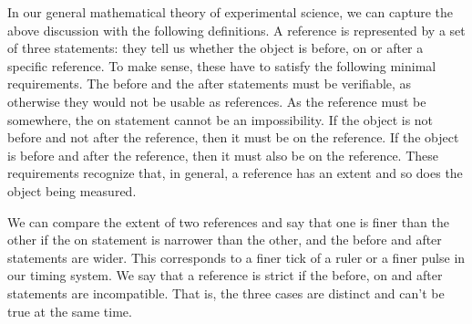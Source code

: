 \documentclass[11pt,letterpaper,fleqn]{memoir} %
\begin{document}
In our general mathematical theory of experimental science, we can capture the above discussion with the following definitions. A reference is represented by a set of three statements: they tell us whether the object is before, on or after a specific reference. To make sense, these have to satisfy the following minimal requirements. The before and the after statements must be verifiable, as otherwise they would not be usable as references. As the reference must be somewhere, the on statement cannot be an impossibility. If the object is not before and not after the reference, then it must be on the reference. If the object is before and after the reference, then it must also be on the reference. These requirements recognize that, in general, a reference has an extent and so does the object being measured.

We can compare the extent of two references and say that one is finer than the other if the on statement is narrower than the other, and the before and after statements are wider. This corresponds to a finer tick of a ruler or a finer pulse in our timing system. We say that a reference is strict if the before, on and after statements are incompatible. That is, the three cases are distinct and can't be true at the same time.
\end{document}
